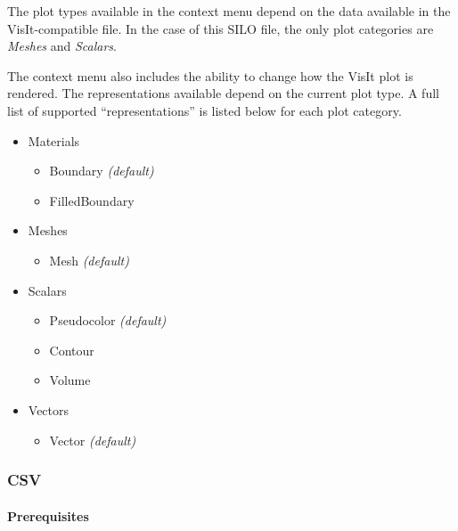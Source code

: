 The plot types available in the context menu depend on the data
available in the VisIt-compatible file. In the case of this SILO file,
the only plot categories are \emph{Meshes} and \emph{Scalars}.

The context menu also includes the ability to change how the VisIt plot
is rendered. The representations available depend on the current plot
type. A full list of supported ``representations'' is listed below for
each plot category.

\begin{itemize}
\itemsep1pt\parskip0pt
\item
  Materials

  \begin{itemize}
  \itemsep1pt\parskip0pt
  \item
    Boundary \emph{(default)}
  \item
    FilledBoundary
  \end{itemize}
\item
  Meshes

  \begin{itemize}
  \itemsep1pt\parskip0pt
  \item
    Mesh \emph{(default)}
  \end{itemize}
\item
  Scalars

  \begin{itemize}
  \itemsep1pt\parskip0pt
  \item
    Pseudocolor \emph{(default)}
  \item
    Contour
  \item
    Volume
  \end{itemize}
\item
  Vectors

  \begin{itemize}
  \itemsep1pt\parskip0pt
  \item
    Vector \emph{(default)}
  \end{itemize}
\end{itemize}

\subsubsection{CSV}\label{csv}

\paragraph{Prerequisites}\label{prerequisites-1}

